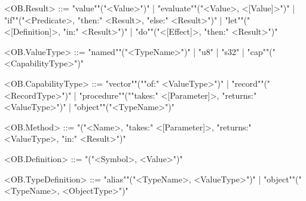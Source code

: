 \documentclass[main.tex]{subfiles}
\begin{document}
\begin{grammar}
				\par
				<OB.Result> ::=
						"value""("<Value>")"
						| "evaluate""("<Value>, <[Value]>")"
						| "if""("<Predicate>, "then:" <Result>, "else:" <Result>")"
						| "let""("<[Definition]>, "in:" <Result>")"
						| "do""("<[Effect]>, "then:" <Result>")"
				\par
				<OB.ValueType> ::=
						"named""("<TypeName>")"
						| "u8"
						| "s32"
						| "cap""("<CapabilityType>")"
				\par
				<OB.CapabilityType> ::=
						"vector""(""of:" <ValueType>")"
						| "record""("<RecordType>")"
						| "procedure""(""takes:" <[Parameter]>, "returns:" <ValueType>")"
						| "object""("<TypeName>")"
				\par
				<OB.Method> ::=
							"("<Name>, "takes:" <[Parameter]>, "returns:" <ValueType>, "in:" <Result>")"
				\par
				<OB.Definition> ::=
							"("<Symbol>, <Value>")"
				\par
				<OB.TypeDefinition> ::=
						"alias""("<TypeName>, <ValueType>")"
						| "object""("<TypeName>, <ObjectType>")"
				\par
\end{grammar}
\par
\end{document}
